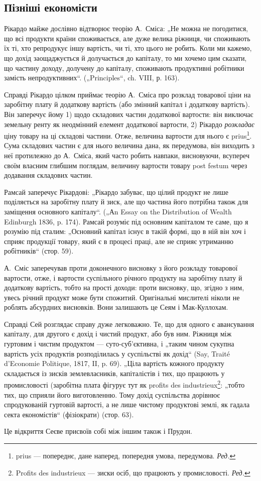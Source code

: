 \subsection[Пізніші економісти]{Пізніші економісти\footnotemark{}}


\label{original-299}
Рікардо
майже дослівно відтворює теорію А.~Сміса: „Не можна не
погодитися, що всі продукти країни споживається, але дуже велика ріжниця,
чи споживають їх ті, хто репродукує іншу вартість, чи ті, хто
цього не робить. Коли ми кажемо, що дохід заощаджується й долучається
до капіталу, то ми хочемо цим сказати, що частину доходу, долучену
до капіталу, споживають продуктивні робітники замість непродуктивних“.
(„Principles“, ch. VIII, р. 163).

Справді Рікардо цілком приймає теорію А.~Сміса про розклад товарової
ціни на заробітну плату й додаткову вартість (або змінний капітал
і додаткову вартість). Він заперечує йому 1) щодо складових частин
додаткової вартости: він виключає земельну ренту як неодмінний елемент
додаткової вартости, 2) Рікардо \emph{розкладає} ціну товару на ці складові
частини. Отже, величина вартости для нього є prius\footnote*{
prius — попереднє, дане наперед, попередня умова, передумова. \emph{Ред.}
}. Сума складових
частин є для нього величина дана, як передумова, він виходить з
неї протилежно до А.~Сміса, який часто робить навпаки, висновуючи,
всупереч своїм власним глибшим поглядам, величину вартости товару
post festum через додавання складових частин.

Рамсай заперечує Рікардові: „Рікардо забуває, що цілий продукт не
лише поділяється на заробітну плату й зиск, але що частина його потрібна
також для заміщення основного капіталу“. („Аn Essay on the Distribution
of Wealth Edinburgh 1836, p. 174). Рамсай розуміє під основним
капіталом те саме, що я розумію під сталим: „Основний капітал
існує в такій формі, що в ній він хоч і сприяє продукції товару, який є
в процесі праці, але не сприяє утриманню робітників“ (стор. 59).

А.~Сміс заперечував проти доконечного висновку з його розкладу
товарової вартости, отже, і вартости суспільного річного продукту на
заробітну плату й додаткову вартість, тобто на прості доходи: проти
висновку, що, згідно з ним, увесь річний продукт може бути спожитий.
Оригінальні мислителі ніколи не роблять абсурдних висновків. Вони залишають
це Сеям і Мак-Куллохам.

Справді Сей розглядає справу дуже легковажно. Те, що для одного є
авансування капіталу, для другого є дохід і чистий продукт, або був ним.
Ріжниця між гуртовим і чистим продуктом — суто-суб’єктивна, і „таким чином
сукупна вартість усіх продуктів розподілилась у суспільстві як дохід“ (Say,
Traité d’Economie Politique, 1817, II, p. 69). „Ціла вартість кожного продукту
складається із зисків землевласників, капіталістів і тих, що працюють у
промисловості (заробітна плата фігурує тут як profits des industrieux\footnote*{
Profits des industrieux — зиски осіб, що працюють у промисловості. \emph{Ред.}
}:
„тобто тих, що сприяли його виготовленню. Тому дохід суспільства дорівнює
спродукованій   гуртовій   вартості, а не лише чистому
продуктові землі, як гадала секта економістів“ (фізіократи) (стор. 63).

Це відкриття Сеєве присвоїв собі між іншим також і Прудон.
